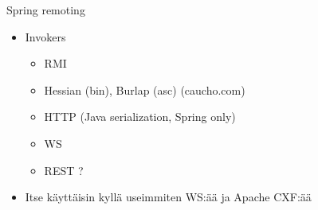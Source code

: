 \documentclass[hyperref={pdfauthor=\AUTHOR},14pt]{beamer}
\author{\AUTHOR}
\title[\TITLE]{\TITLE}
\date{\DATE}
\begin{document}
\begin{frame}[plain]
\titlepage
\end{frame}

\begin{frame}{Spring remoting}
\begin{itemize}
\item Invokers
\begin{itemize}
\item RMI
\item Hessian (bin), Burlap (asc) (caucho.com)
\item HTTP (Java serialization, Spring only)
\item WS
\item REST ?
\end{itemize}
\item Itse käyttäisin kyllä useimmiten WS:ää ja Apache CXF:ää
\end{itemize}
\end{frame}

\end{document}
